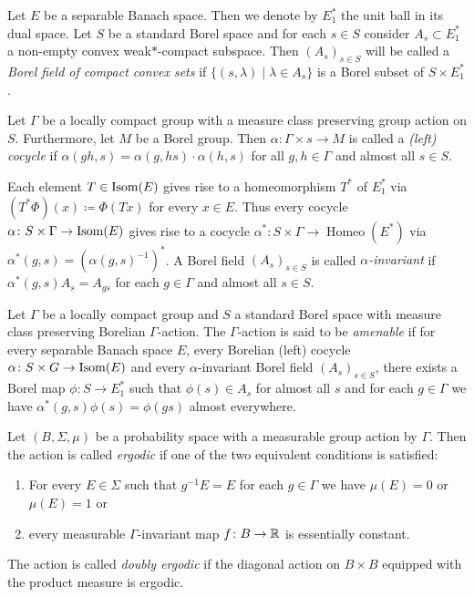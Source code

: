 \begin{defin}
  Let \(E\) be a separable Banach space. Then we denote by \(E^\ast_1\) the unit ball in its dual space. Let \(S\) be a standard Borel space and for each \(s \in S\) consider \(A_s \subset E^\ast_1\) a non-empty convex weak\(\ast\)-compact subspace. Then \((A_s)_{s \in S}\) will be called a \emph{Borel field of compact convex sets} if \(\{(s, \lambda) \mid \lambda \in A_s\}\) is a Borel subset of \(S \times E^\ast_1\).

  Let \(\Gamma\) be a locally compact group with a measure class preserving group action on \(S\). Furthermore, let \(M\) be a Borel group. Then \(\alpha \colon \Gamma \times s \to M\) is called a \emph{(left) cocycle} if \(\alpha(gh, s) = \alpha(g, hs)\cdot \alpha(h, s)\) for all \(g, h \in \Gamma\) and almost all \(s \in S\).

  Each element \(T \in \operatorname{Isom}(E)\) gives rise to a homeomorphism \(T^\ast\) of \(E^\ast_1\) via \((T^\ast\Phi)(x) \coloneqq \Phi(Tx)\) for every \(x \in E\). Thus every cocycle \(\alpha \colon S \times \Gamma \to \operatorname{Isom}(E)\) gives rise to a cocycle \(\alpha^\ast \colon S \times \Gamma \to \operatorname{Homeo}(E^\ast)\) via \(\alpha^\ast (g, s) = (\alpha(g, s)^{-1})^\ast\). A Borel field \((A_s)_{s \in S}\) is called \emph{\(\alpha\)-invariant} if \(\alpha^\ast(g, s) A_{s} = A_{gs}\) for each \(g \in \Gamma\) and almost all \(s \in S\).
  
  Let \(\Gamma\) be a locally compact group and \(S\) a standard Borel space with measure class preserving Borelian \(\Gamma\)-action. The \(\Gamma\)-action is said to be \emph{amenable} if for every separable Banach space \(E\), every Borelian (left) cocycle \(\alpha \colon S \times G \to \operatorname{Isom}(E)\) and every \(\alpha\)-invariant Borel field \((A_s)_{s \in S}\), there exists a Borel map \(\phi \colon S \to E^\ast_1\) such that \(\phi(s) \in A_s\) for almost all \(s\) and for each \(g \in \Gamma\) we have \(\alpha^\ast(g, s) \phi(s) = \phi(gs)\) almost everywhere.
\end{defin}

\begin{defin}
  Let \((B, \Sigma, \mu)\) be a probability space with a measurable group action by \(\Gamma\). Then the action is called \emph{ergodic} if one of the two equivalent conditions is satisfied:
  \begin{enumerate}
  \item For every \(E \in \Sigma\) such that \(g^{-1}E = E\) for each \(g \in \Gamma\) we have \(\mu(E) = 0\) or \(\mu(E) = 1\) or
  \item every measurable \(\Gamma\)-invariant map \(f\colon B \to \mathbb{R}\) is essentially constant.
  \end{enumerate}
  The action is called \emph{doubly ergodic} if the diagonal action on \(B \times B\) equipped with the product measure is ergodic.
\end{defin}

